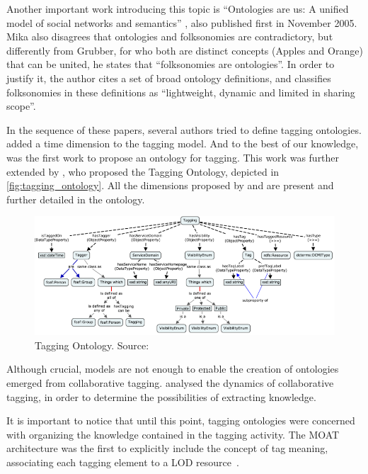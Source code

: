 Another important work introducing this topic is ``Ontologies are us: A unified model of social networks and semantics'' \cite{Mika2007}, also published first in November 2005.
Mika also disagrees that ontologies and folksonomies are contradictory, but differently from Grubber, for who both are distinct concepts (Apples and Orange) that can be united, he states that ``folksonomies are ontologies''.
In order to justify it, the author cites a set of broad ontology definitions, and classifies folksonomies in these definitions as ``lightweight, dynamic and limited in sharing scope''.

In the sequence of these papers, several authors tried to define tagging ontologies.
 added a time dimension to the tagging model.
And to the best of our knowledge,  was the first work to propose an ontology for tagging.
This work was further extended by , who proposed the Tagging Ontology, depicted in \autoref{fig:tagging_ontology}.
All the dimensions proposed by  and  are present and further detailed in the ontology.

\begin{figure}[tb]
\begin{center}
\includegraphics[width=\columnwidth]{images/tagging_ontology.png}
\caption[Tagging Ontology.]{Tagging Ontology. Source:  }
\label{fig:tagging_ontology}
\end{center}
\end{figure}

Although crucial, models are not enough to enable the creation of ontologies emerged from collaborative tagging.
 analysed the dynamics of collaborative tagging, in order to determine the possibilities of extracting knowledge.

It is important to notice that until this point, tagging ontologies were concerned with organizing the knowledge contained in the tagging activity.
The MOAT architecture was the first to explicitly include the concept of tag meaning, associating each tagging element to a LOD resource~\cite{Passant2008}.

